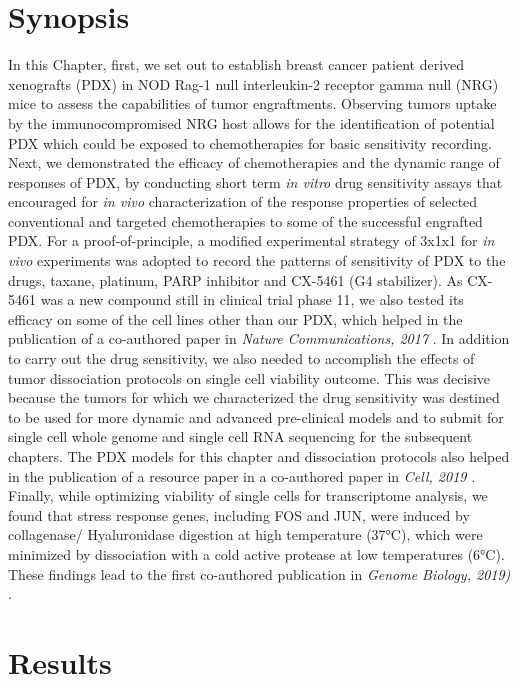 \section{Synopsis}
 In this Chapter, first, we set out to establish  breast cancer patient derived xenografts (PDX) in NOD Rag-1 null interleukin-2 receptor gamma null (NRG) mice to assess the capabilities of tumor  engraftments. Observing tumors uptake by the immunocompromised NRG host allows 
 for the identification of potential PDX which could be exposed to chemotherapies for basic sensitivity recording. Next, we demonstrated the efficacy of chemotherapies and the dynamic range of responses of PDX, by conducting short term \textit{ in vitro} drug sensitivity assays that encouraged for \textit{in vivo} characterization of the response properties of selected conventional and targeted chemotherapies to some of the successful engrafted  PDX.  For a proof-of-principle, a modified experimental strategy of 3x1x1 for \textit{ in vivo} experiments was adopted to record the patterns of sensitivity of PDX to the drugs, taxane, platinum, PARP inhibitor and CX-5461 (G4 stabilizer). As CX-5461 was a new compound still in clinical trial phase 11, we also tested its efficacy on some of the cell lines other than our PDX, which helped in the publication of a co-authored paper in \textit{Nature Communications, 2017} \cite{xu2017cx}. In addition to carry out the drug sensitivity, we also needed to accomplish the effects of  tumor dissociation protocols on single cell viability outcome. This was decisive because the tumors for which we characterized the drug sensitivity was destined to be used for more dynamic and advanced pre-clinical models and to submit for single cell whole genome and single cell RNA sequencing for the subsequent chapters. The PDX models for this chapter and dissociation protocols also helped in the publication of a resource paper in a co-authored paper in \textit {Cell, 2019} \cite{laks2019clonal}. Finally, while optimizing viability of single cells for transcriptome analysis, we found that stress response genes, including FOS and JUN, were induced by collagenase/ Hyaluronidase digestion at high temperature (37°C), which were minimized by dissociation with a cold active protease at low temperatures (6°C). These findings lead to the first co-authored publication in \textit {Genome Biology, 2019)} \cite{o2019dissociation}.
 
\section{Results}

